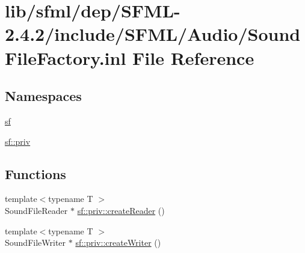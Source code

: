 \hypertarget{sfml_2dep_2_s_f_m_l-2_84_82_2include_2_s_f_m_l_2_audio_2_sound_file_factory_8inl}{\section{lib/sfml/dep/\-S\-F\-M\-L-\/2.4.2/include/\-S\-F\-M\-L/\-Audio/\-Sound\-File\-Factory.inl File Reference}
\label{sfml_2dep_2_s_f_m_l-2_84_82_2include_2_s_f_m_l_2_audio_2_sound_file_factory_8inl}
}
\subsection*{Namespaces}
\begin{DoxyCompactItemize}
\item 
\hyperlink{namespacesf}{sf}
\item 
\hyperlink{namespacesf_1_1priv}{sf\-::priv}
\end{DoxyCompactItemize}
\subsection*{Functions}
\begin{DoxyCompactItemize}
\item 
{\footnotesize template$<$typename T $>$ }\\Sound\-File\-Reader $\ast$ \hyperlink{namespacesf_1_1priv_aca30ad5e6ee22353d72145af1af53b78}{sf\-::priv\-::create\-Reader} ()
\item 
{\footnotesize template$<$typename T $>$ }\\Sound\-File\-Writer $\ast$ \hyperlink{namespacesf_1_1priv_aaa8b548de29fc4570064f372b4df8df0}{sf\-::priv\-::create\-Writer} ()
\end{DoxyCompactItemize}
